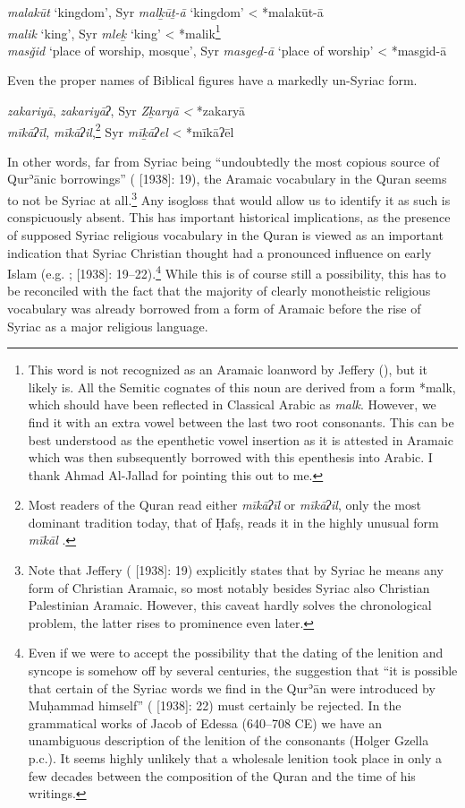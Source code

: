 \documentclass[output=paper]{langsci/langscibook}
\begin{document}
\ea
\ea\textit{malakūt} ‘kingdom’, Syr \textit{malḵūṯ-ā} ‘kingdom’ < *malakūt-ā\\
\ex\textit{malik} ‘king’, Syr \textit{mleḵ} ‘king’ < *malik\footnote{This word is not recognized as an Aramaic loanword by Jeffery (\citeyear[270]{Jeffrey2007}), but it likely is. All the Semitic cognates of this noun are derived from a form *malk, which should have been reflected in Classical Arabic as \textit{malk}. However, we find it with an extra vowel between the last two root consonants. This can be best understood as the epenthetic vowel insertion as it is attested in Aramaic which was then subsequently borrowed with this epenthesis into Arabic. I thank Ahmad Al-Jallad for pointing this out to me.}\\
\ex\textit{masǧid} ‘place of worship, mosque’, Syr \textit{masgeḏ-ā} ‘place of worship’ < *masgid-ā
\z
\z

\noindent Even the proper names of Biblical figures have a markedly un-Syriac form.

\ea
\ea\textit{zakariyā}, \textit{zakariyāʔ}, Syr \textit{Zḵaryā} \textit{<} *zakaryā\\
\ex\textit{mīkāʔīl,} \textit{mīkāʔil},\footnote{Most readers of the Quran read either \textit{mīkāʔīl} or \textit{mīkāʔil}, only the most dominant tradition today, that of Ḥafṣ, reads it in the highly unusual form \textit{mīkāl} \citep[166]{IbnMujahid}.} Syr \textit{mīḵāʔel} < *mīkāʔēl
\z
\z

In other words, far from Syriac being “undoubtedly the most copious source of Qurʾānic borrowings” (\citealt{Jeffrey2007} [1938]: 19), the Aramaic vocabulary in the Quran seems to not be Syriac at all.\footnote{Note that Jeffery (\citeyear{Jeffrey2007} [1938]: 19) explicitly states that by Syriac he means any form of Christian Aramaic, so most notably besides Syriac also Christian Palestinian Aramaic. However, this caveat hardly solves the chronological problem, the latter rises to prominence even later.} Any isogloss that would allow us to identify it as such is conspicuously absent. This has important historical implications, as the presence of supposed Syriac religious vocabulary in the Quran is viewed as an important indication that Syriac Christian thought had a pronounced influence on early Islam (e.g. \citealt[82--90]{Mingana1927}; \citealt{Jeffrey2007} [1938]: 19--22).\footnote{Even if we were to accept the possibility that the dating of the lenition and syncope is somehow off by several centuries, the suggestion that “it is possible that certain of the Syriac words we find in the Qurʾān were introduced by Muḥammad himself” (\citealt{Jeffrey2007} [1938]: 22) must certainly be rejected. In the grammatical works of Jacob of Edessa (640–708 CE) we have an unambiguous description of the lenition of the consonants (Holger Gzella p.c.). It seems highly unlikely that a wholesale lenition took place in only a few decades between the composition of the Quran and the time of his writings.} While this is of course still a possibility, this has to be reconciled with the fact that the majority of clearly monotheistic religious vocabulary was already borrowed from a form of Aramaic before the rise of Syriac as a major religious language.
\end{document}
